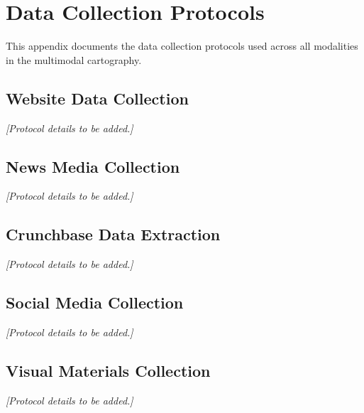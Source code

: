 \documentclass[../main.tex]{subfiles}
\begin{document}
\chapter{Data Collection Protocols}

This appendix documents the data collection protocols used across all modalities in the \RoleBox{} multimodal cartography.

\section{Website Data Collection}

\textit{[Protocol details to be added.]}

\section{News Media Collection}

\textit{[Protocol details to be added.]}

\section{Crunchbase Data Extraction}

\textit{[Protocol details to be added.]}

\section{Social Media Collection}

\textit{[Protocol details to be added.]}

\section{Visual Materials Collection}

\textit{[Protocol details to be added.]}
\end{document}
